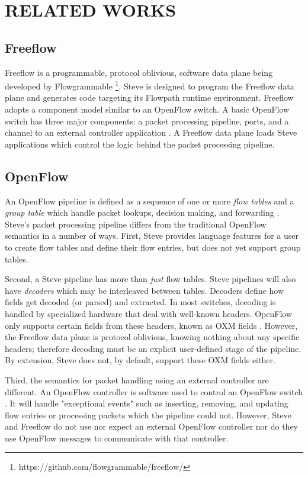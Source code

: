 \chapter{RELATED WORKS} \label{ch:related}

\section{Freeflow} \label{rel:freeflow}

Freeflow is a programmable, protocol oblivious, software data plane being developed
by Flowgrammable \footnote{https://github.com/flowgrammable/freeflow/}. Steve is
designed to program the Freeflow data plane and generates code targeting its
Flowpath runtime environment. Freeflow adopts a component model similar to an OpenFlow switch. A basic OpenFlow switch
has three major components: a packet processing pipeline, ports, and a channel
to an external controller application \cite{openflow_spec}. A Freeflow data
plane loads Steve applications which control the logic behind the packet
processing pipeline.

\section{OpenFlow} \label{rel:openflow}

An OpenFlow pipeline is defined as a sequence
of one or more \textit{flow tables} and a \textit{group table} which handle
packet lookups, decision making, and forwarding \cite{openflow_spec}. Steve's packet processing pipeline differs from the traditional OpenFlow
semantics in a number of ways. First,
Steve provides language features for a user to create flow tables and define
their flow entries, but does not yet support group tables. 

Second, a Steve pipeline has more than \textit{just} flow tables. Steve
pipelines will also have \textit{decoders} which may be interleaved between
tables. Decoders define how fields get decoded (or parsed) and extracted. In
most switches, decoding is handled by specialized hardware that deal with
well-known headers. OpenFlow only supports certain fields from these headers,
known as OXM fields \cite{openflow_spec}. However, the Freeflow data plane is
protocol oblivious, knowing nothing about any specific headers; therefore
decoding must be an explicit user-defined stage of the pipeline. By extension,
Steve does not, by default, support these OXM fields either.

Third, the semantics for packet handling using an external controller are different. An OpenFlow controller is software used to control an OpenFlow switch \cite{openflow_spec}. It will handle "exceptional events" such as inserting,
removing, and updating flow entries or processing packets which the pipeline
could not. However, Steve and Freeflow do not use nor expect an external
OpenFlow controller nor do they use OpenFlow messages to communicate with that
controller. 

